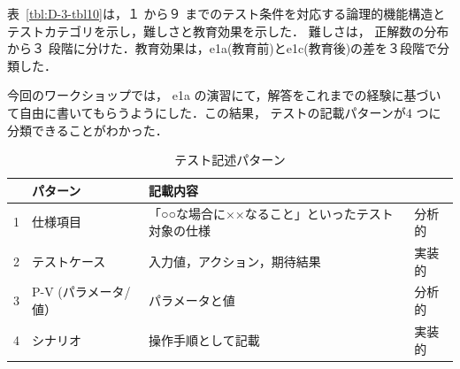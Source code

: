 \documentclass[a4paper,11pt]{jreport}
\begin{document}
表~\ref{tbl:D-3-tbl10}は，１ から９ までのテスト条件を対応する論理的機能構造とテストカテゴリを示し，難しさと教育効果を示した． 難しさは， 正解数の分布から３ 段階に分けた．教育効果は，e1a(教育前)とe1c(教育後)の差を３段階で分類した．

今回のワークショップでは， e1a の演習にて，解答をこれまでの経験に基づいて自由に書いてもらうようにした．この結果， テストの記載パターンが4 つに分類できることがわかった．
\begin{table}[htbp]
  \centering
  \caption{テスト記述パターン}
    \begin{tabular}{|c|p{8.57em}|p{10.215em}|p{3.855em}|}
    \hline
          & \textbf{パターン} & \textbf{記載内容} & \multicolumn{1}{c|}{} \bigstrut\\
    \hline
    1     & 仕様項目  & 「○○な場合に××なること」といったテスト対象の仕様 & 分析的 \bigstrut\\
    \hline
    2     & テストケース & 入力値，アクション，期待結果 & 実装的 \bigstrut\\
    \hline
    3     & P-V
(パラメータ/値） & パラメータと値 & 分析的 \bigstrut[t]\\
    4     & シナリオ  & 操作手順として記載 & 実装的 \bigstrut[b]\\
    \hline
    \end{tabular}%
  \label{tbl:D-3-tbl11}%
\end{table}%
\end{document}
